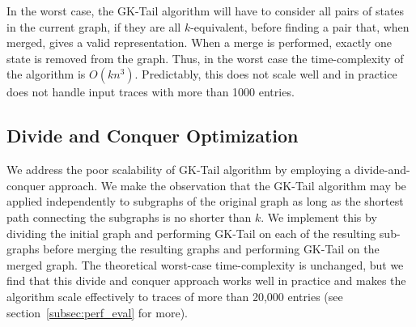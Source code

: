 In the worst case, the GK-Tail algorithm will have to consider all
pairs of states in the current graph, if they are all $k$-equivalent,
before finding a pair that, when merged, gives a valid
representation. When a merge is performed, exactly one state is
removed from the graph. Thus, in the worst case the time-complexity of
the algorithm is $O(kn^3)$. Predictably, this does not scale well and
in practice does not handle input traces with more than 1000 entries.

\subsection{Divide and Conquer Optimization}

We address the poor scalability of GK-Tail algorithm by employing a
divide-and-conquer approach. We make the observation that the GK-Tail
algorithm may be applied independently to subgraphs of the original
graph as long as the shortest path connecting the subgraphs is no
shorter than $k$. We implement this by dividing the initial graph and
performing GK-Tail on each of the resulting sub-graphs before merging
the resulting graphs and performing GK-Tail on the merged graph. The
theoretical worst-case time-complexity is unchanged, but we find that
this divide and conquer approach works well in practice and makes the
algorithm scale effectively to traces of more than 20,000 entries (see
section~\ref{subsec:perf_eval} for more).
